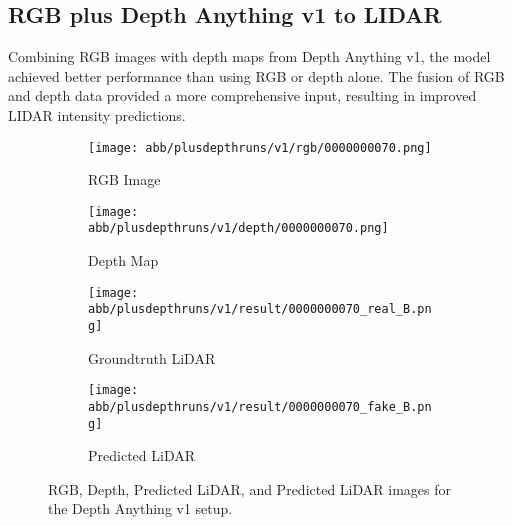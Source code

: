 \subsection{RGB plus Depth Anything v1 to LIDAR}
Combining RGB images with depth maps from Depth Anything v1, the model achieved better performance than using RGB or depth alone. The fusion of RGB and depth data provided a more comprehensive input, resulting in improved LIDAR intensity predictions.
\begin{figure}[!ht]
	\centering
	\begin{subfigure}{0.4\textwidth}
		\centering
		\texttt{[image: abb/plusdepthruns/v1/rgb/0000000070.png]}
		\caption{RGB Image}
		\label{fig:v1_rgb}
	\end{subfigure}
	
	\vspace{1em} %
	
	\begin{subfigure}{0.4\textwidth}
		\centering
		\texttt{[image: abb/plusdepthruns/v1/depth/0000000070.png]}
		\caption{Depth Map}
		\label{fig:v1_depth}
	\end{subfigure}
	
	\vspace{1em} %
	
	\begin{subfigure}{0.25\textwidth}
		\centering
		\texttt{[image: abb/plusdepthruns/v1/result/0000000070\_real\_B.png]}
		\caption{Groundtruth LiDAR}
		\label{fig:v1_pred_lidar}
	\end{subfigure}
	\begin{subfigure}{0.25\textwidth}
		\centering
		\texttt{[image: abb/plusdepthruns/v1/result/0000000070\_fake\_B.png]}
		\caption{Predicted LiDAR}
		\label{fig:v1_fake_lidar}
	\end{subfigure}
	
	\caption{RGB, Depth, Predicted LiDAR, and Predicted LiDAR images for the Depth Anything v1 setup.}
	\label{fig:v1plusdepth}
\end{figure}

